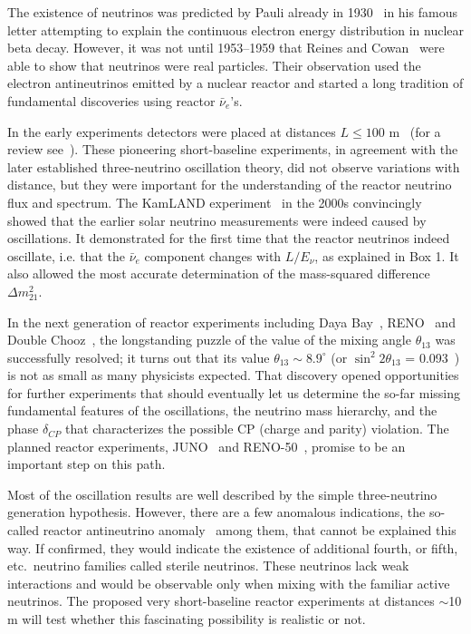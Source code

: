 \documentclass[aps,twocolumn,preprintnumbers,amsmath,superscriptaddress,amssymb,floats,nofootinbib]{revtex4-1}
\begin{document}
The existence of neutrinos was predicted by Pauli already in 1930~\cite{Pauli30} in his famous letter attempting to explain the continuous electron energy 
distribution in nuclear beta decay. 
However, it was not until 1953--1959 that Reines and Cowan~\cite{Reines53,Cowan56,Reines59} were able to show that neutrinos were real particles. 
Their observation used the electron antineutrinos emitted by a nuclear reactor and started a long tradition of fundamental discoveries using reactor $\bar{\nu}_e$'s.

In the early experiments detectors were placed at distances $L \le 100$ m~\cite{ILL,Gosgen,Rovno,Krasnoyarsk,SRP,Bugey4,Bugey3} (for a review see~\cite{Bemporad02}). 
These pioneering short-baseline experiments, in agreement with the later established three-neutrino oscillation theory, did not observe variations with distance,  
but they were important for the understanding of the reactor neutrino flux and spectrum.
The KamLAND experiment~\cite{Kamland03,Kamland05,Kamland08} in the 2000s convincingly showed that the earlier solar neutrino measurements were indeed caused by oscillations. 
It demonstrated for the first time that the reactor neutrinos indeed oscillate, i.e. that the $\bar{\nu}_e$ component changes with $L/E_{\nu}$, as explained in Box 1.
It also allowed the most accurate determination of the mass-squared difference $\Delta m^2_{21}$.  


In the next generation of reactor experiments including Daya Bay~\cite{Dayabay,Dayabay14}, RENO~\cite{Reno}  and Double Chooz~\cite{DChooz,DChooz14}, the longstanding puzzle of the
value of the mixing angle $\theta_{13}$ was successfully resolved; it turns out that its value $\theta_{13} \sim 8.9^\circ$ (or $\sin^2 2\theta_{13}$ = 0.093~\cite{PDG14})
is not as small as many physicists expected. That discovery opened opportunities for further experiments that should eventually 
let us determine the so-far missing fundamental features of the oscillations, the neutrino mass hierarchy, and the phase $\delta_{CP}$ that characterizes the possible CP (charge and parity) violation. 
The planned reactor experiments, JUNO~\cite{He-Now2014} and RENO-50~\cite{RENO-50}, promise to be an important step on this path.

Most of the oscillation results are well described by the simple three-neutrino generation hypothesis. However, there are a few anomalous indications,
the so-called reactor antineutrino anomaly~\cite{Mention} among them, that cannot be explained this way. If confirmed, they would indicate the existence of additional
fourth, or fifth, etc.~neutrino families called sterile neutrinos. 
These neutrinos lack weak interactions and would be observable only when mixing with the familiar active neutrinos.  
The proposed very short-baseline reactor experiments at distances $\sim$10 m will test whether this fascinating possibility is realistic or not.
\end{document}
